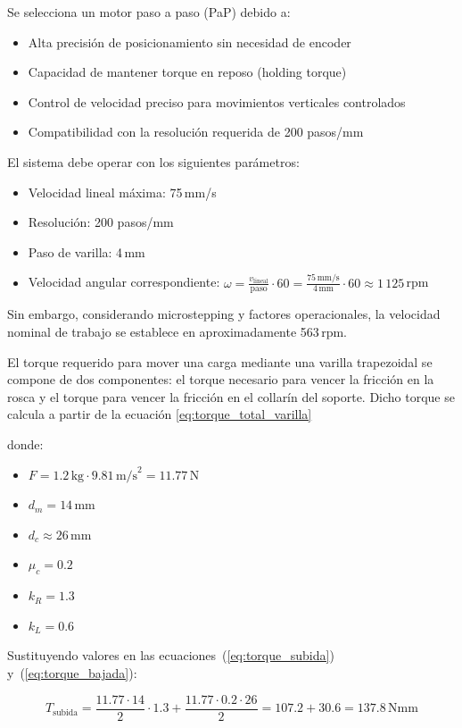 Se selecciona un motor paso a paso (PaP) debido a:
\begin{itemize}
    \item Alta precisión de posicionamiento sin necesidad de encoder
    \item Capacidad de mantener torque en reposo (holding torque)
    \item Control de velocidad preciso para movimientos verticales controlados
    \item Compatibilidad con la resolución requerida de 200 pasos/mm
\end{itemize}

El sistema debe operar con los siguientes parámetros:
\begin{itemize}
    \item Velocidad lineal máxima: 75\,mm/s
    \item Resolución: 200 pasos/mm
    \item Paso de varilla: 4\,mm
    \item Velocidad angular correspondiente: $\omega = \frac{v_{\text{lineal}}}{\text{paso}} \cdot 60 = \frac{75\,\text{mm/s}}{4\,\text{mm}} \cdot 60 \approx 1\,125$\,rpm
\end{itemize}

Sin embargo, considerando microstepping y factores operacionales, la velocidad nominal de trabajo se establece en aproximadamente 563\,rpm.

El torque requerido para mover una carga mediante una varilla trapezoidal se compone de dos componentes: el torque necesario para vencer la fricción en la rosca y el torque para vencer la fricción en el collarín del soporte. Dicho torque se calcula a partir de la ecuación \ref{eq:torque_total_varilla}

donde:
\begin{itemize}
    \item $F = 1.2\,\text{kg} \cdot 9.81\,\text{m/s}^2 = 11.77$\,N
    \item $d_m = 14$\,mm 
    \item $d_c \approx 26$\,mm
    \item $\mu_c = 0.2$ 
    \item $k_R = 1.3$ 
    \item $k_L = 0.6$ 
\end{itemize}

Sustituyendo valores en las ecuaciones~(\ref{eq:torque_subida}) y~(\ref{eq:torque_bajada}):

\[T_{\text{subida}} = \frac{11.77 \cdot 14}{2} \cdot 1.3 + \frac{11.77 \cdot 0.2 \cdot 26}{2} = 107.2 + 30.6 = 137.8\,\text{Nmm}\]

